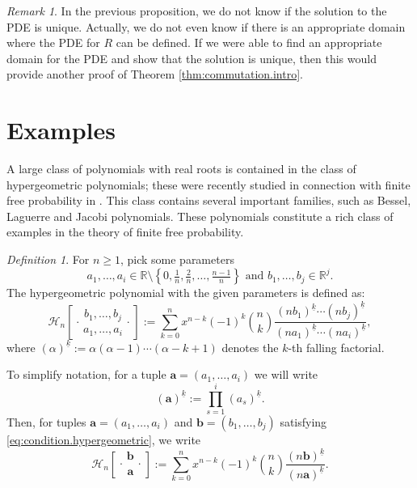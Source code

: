 \documentclass[reqno,11pt]{amsart}
\theoremstyle{remark}
\newtheorem{remark}[theorem]{Remark}
\newtheorem{definition}[theorem]{Definition}
\newcommand{\rr}{\mathbb{R}}
\newcommand{\falling}[2]{\left(#1\right)^{\underline{#2}}}
\newcommand*\HGP[3]{%
 \mathcal{H}_{#1}{\left[\genfrac..{0pt}{1}{#2}{#3}\right]}%
}
\begin{document}
\begin{remark}
In the previous proposition, we do not know if the solution to the PDE is unique. Actually, we do not even know if there is an appropriate domain where the PDE for $R$ can be defined. If we were able to find an appropriate domain for the PDE and show that the solution is unique, then this would provide another proof of Theorem \ref{thm:commutation.intro}. 
\end{remark}


\section{Examples}
\label{sec:examples}


A large class of polynomials with real roots is contained in the class of hypergeometric polynomials; these were recently studied in connection with finite free probability in \cite{martinez2024hypergeometric}. This class contains several important families, such as Bessel, Laguerre and Jacobi polynomials. These polynomials constitute a rich class of examples in the theory of finite free probability.

\begin{definition}
    \label{def:H.polynomials}
    For $n \geq 1$, pick some parameters
    \begin{equation} \label{eq:condition.hypergeometric}
    a_1, \ldots, a_i \in \rr \setminus \left\{ 0,\tfrac{1}{n},\tfrac{2}{n}, \ldots, \tfrac{n-1}{n}\right\} \text{ and } b_1,\ldots,b_j \in \rr^j.
    \end{equation} 
The hypergeometric polynomial with the given parameters is defined as:
 \[ \HGP{n}{b_1,\ldots,b_j}{a_1,\ldots,a_i} := \sum_{k=0}^n x^{n-k} (-1)^k \binom{n}{k} \frac{\falling{nb_1}{k} \cdots \falling{nb_j}{k}}{\falling{na_1}{k}\cdots \falling{na_i}{k}}, \]
where $\falling{\alpha}{k}:=\alpha(\alpha-1)\cdots (\alpha-k+1)$ denotes the $k$-th falling factorial.
    
To simplify notation, for a tuple $\bm a =(a_1, \ldots, a_i)$ we will write
\[ \falling{\bm a}{k} := \prod_{s=1}^i \falling{a_s}{k} \text{.} \]
Then, for tuples $\bm a = (a_1,\ldots,a_i)$ and $\bm b = (b_1,\ldots,b_j)$ satisfying \eqref{eq:condition.hypergeometric}, we write
\[ \HGP{n}{\bm b}{\bm a} := \sum_{k=0}^n x^{n-k} (-1)^k \binom{n}{k} \frac{\falling{n\bm b}{k} }{ \falling{n \bm a}{k}}. \]
\end{definition}
\end{document}
